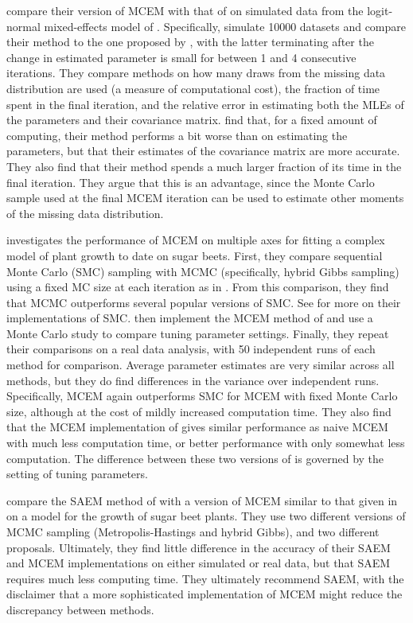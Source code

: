 \documentclass[11pt, oneside]{article}   	%
\begin{document}
\citet{Caf05} compare their version of MCEM with that of \citet{Boo99} on simulated data from the logit-normal mixed-effects model of \citet{McC97}. Specifically, \citeauthor{Caf05} simulate 10000 datasets and compare their method to the one proposed by \citet{Boo99}, with the latter terminating after the change in estimated parameter is small for between 1 and 4 consecutive iterations. They compare methods on how many draws from the missing data distribution are used (a measure of computational cost), the fraction of time spent in the final iteration, and the relative error in estimating both the MLEs of the parameters and their covariance matrix. \citeauthor{Caf05} find that, for a fixed amount of computing, their method performs a bit worse than \citet{Boo99} on estimating the parameters, but that their estimates of the covariance matrix are more accurate. They also find that their method spends a much larger fraction of its time in the final iteration. They argue that this is an advantage, since the Monte Carlo sample used at the final MCEM iteration can be used to estimate other moments of the missing data distribution.

\citet{Tre14} investigates the performance of MCEM on multiple axes for fitting a complex model of plant growth to date on sugar beets. First, they compare sequential Monte Carlo (SMC) sampling with MCMC (specifically, hybrid Gibbs sampling) using a fixed MC size at each iteration as in \citet{Wei90}. From this comparison, they find that MCMC outperforms several popular versions of SMC. See \citet{Tre13} for more on their implementations of SMC. \citeauthor{Tre14} then implement the MCEM method of \citet{Caf05} and use a Monte Carlo study to compare tuning parameter settings. Finally, they repeat their comparisons on a real data analysis, with 50 independent runs of each method for comparison. Average parameter estimates are very similar across all methods, but they do find differences in the variance over independent runs. Specifically, MCEM again outperforms SMC for MCEM with fixed Monte Carlo size, although at the cost of mildly increased computation time. They also find that the MCEM implementation of \citet{Caf05} gives similar performance as naive MCEM with much less computation time, or better performance with only somewhat less computation. The difference between these two versions of \citet{Caf05} is governed by the setting of tuning parameters.

\citet{Bae16} compare the SAEM method of \citet{Dey99} with a version of MCEM similar to that given in \citet{McC97} on a model for the growth of sugar beet plants. They use two different versions of MCMC sampling (Metropolis-Hastings and hybrid Gibbs), and two different proposals. Ultimately, they find little difference in the accuracy of their SAEM and MCEM implementations on either simulated or real data, but that SAEM requires much less computing time. They ultimately recommend SAEM, with the disclaimer that a more sophisticated implementation of MCEM \citep[e.g.,][]{Caf05,Boo99} might reduce the discrepancy between methods.
\end{document}
